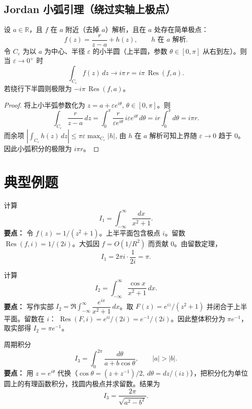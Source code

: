 \documentclass[lang=cn,10pt]{elegantbook}
\begin{document}
	\subsection{Jordan 小弧引理（绕过实轴上极点）}
	
	\begin{definition}
		设 \(a\in\mathbb R\)，且 \(f\) 在 \(a\) 附近（去掉 \(a\)）解析，且在 \(a\) 处存在简单极点：
		\[
		f(z)=\frac{r}{z-a}+h(z),\qquad h \text{ 在 } a \text{ 解析}.
		\]
		令 \(C_\varepsilon\) 为以 \(a\) 为中心、半径 \(\varepsilon\) 的小半圆（上半圆，参数 \(\theta\in[0,\pi]\) 从右到左）。则当 \(\varepsilon\to0^+\) 时
		\[
		\int_{C_\varepsilon} f(z)\,dz \to i\pi\,r = i\pi\,\operatorname{Res}(f,a).
		\]
		若绕行下半圆则极限为 \(-i\pi\,\operatorname{Res}(f,a)\)。
	\end{definition}
	\begin{proof}
		将上小半弧参数化为 \(z=a+\varepsilon e^{i\theta}\), \(\theta\in[0,\pi]\)。则
		\[
		\int_{C_\varepsilon} \frac{r}{z-a}\,dz
		= \int_0^\pi \frac{r}{\varepsilon e^{i\theta}} \, i\varepsilon e^{i\theta}\,d\theta
		= i r \int_0^\pi d\theta = i\pi r.
		\]
		而余项
		\(\left|\int_{C_\varepsilon} h(z)\,dz\right|\le \pi\varepsilon \max_{C_\varepsilon}|h|\),
		由 \(h\) 在 \(a\) 解析可知上界随 \(\varepsilon\to0\) 趋于 \(0\)。因此小弧积分的极限为 \(i\pi r\)。
	\end{proof}

	
	\section{典型例题}
	
	\begin{example}
		 计算
		\[
		I_1=\int_{-\infty}^\infty \frac{dx}{x^2+1}.
		\]
		\textbf{要点：} 令 \(f(z)=1/(z^2+1)\)。上半平面包含极点 \(i\)。留数 \(\operatorname{Res}(f,i)=1/(2i)\)。大弧因 \(f=O(1/R^2)\) 而贡献 \(0\)。由留数定理，
		\[
		I_1 = 2\pi i\cdot\frac{1}{2i}=\pi.
		\]
	\end{example}
	
	\begin{example}
		计算
		\[
		I_2=\int_{-\infty}^\infty \frac{\cos x}{x^2+1}\,dx.
		\]
		\textbf{要点：} 写作实部 \(I_2=\Re \int_{-\infty}^\infty \dfrac{e^{ix}}{x^2+1}\,dx\)。取 \(F(z)=e^{iz}/(z^2+1)\) 并闭合于上半平面。留数在 \(i\)： \(\operatorname{Res}(F,i)=e^{ii}/(2i)=e^{-1}/(2i)\)。因此整体积分为 \(\pi e^{-1}\)，取实部得 \(I_2=\pi e^{-1}\)。
	\end{example}
	
	\begin{example}
		 周期积分
		\[
		I_3=\int_0^{2\pi}\frac{d\theta}{a+b\cos\theta},\qquad |a|>|b|.
		\]
		\textbf{要点：} 用 \(z=e^{i\theta}\) 代换（\(\cos\theta=(z+z^{-1})/2,\ d\theta=dz/(iz)\)），把积分化为单位圆上的有理函数积分，找圆内极点并求留数。结果为
		\[
		I_3=\frac{2\pi}{\sqrt{a^2-b^2}}.
		\]
	\end{example}
	
\end{document}
